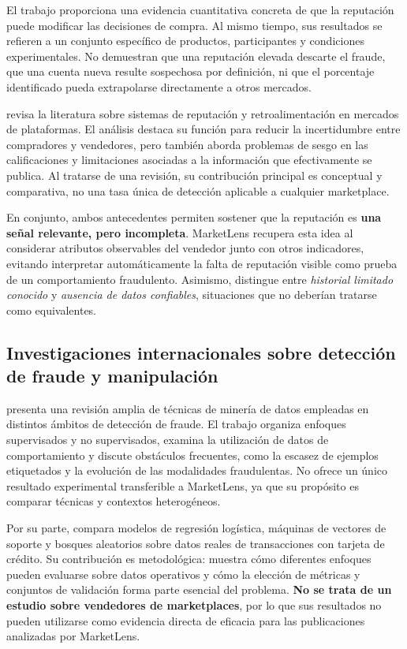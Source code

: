 El trabajo proporciona una evidencia cuantitativa concreta de que la reputación puede modificar las decisiones de compra. Al mismo tiempo, sus resultados se refieren a un conjunto específico de productos, participantes y condiciones experimentales. No demuestran que una reputación elevada descarte el fraude, que una cuenta nueva resulte sospechosa por definición, ni que el porcentaje identificado pueda extrapolarse directamente a otros mercados.

\textcite{ml-tadelis-2016} revisa la literatura sobre sistemas de reputación y retroalimentación en mercados de plataformas. El análisis destaca su función para reducir la incertidumbre entre compradores y vendedores, pero también aborda problemas de sesgo en las calificaciones y limitaciones asociadas a la información que efectivamente se publica. Al tratarse de una revisión, su contribución principal es conceptual y comparativa, no una tasa única de detección aplicable a cualquier marketplace.

En conjunto, ambos antecedentes permiten sostener que la reputación es \textbf{una señal relevante, pero incompleta}. MarketLens recupera esta idea al considerar atributos observables del vendedor junto con otros indicadores, evitando interpretar automáticamente la falta de reputación visible como prueba de un comportamiento fraudulento. Asimismo, distingue entre \emph{historial limitado conocido} y \emph{ausencia de datos confiables}, situaciones que no deberían tratarse como equivalentes.

\subsection{Investigaciones internacionales sobre detección de fraude y manipulación}\label{subsec:ml-fraude-investigaciones}

\textcite{ml-phua-2010} presenta una revisión amplia de técnicas de minería de datos empleadas en distintos ámbitos de detección de fraude. El trabajo organiza enfoques supervisados y no supervisados, examina la utilización de datos de comportamiento y discute obstáculos frecuentes, como la escasez de ejemplos etiquetados y la evolución de las modalidades fraudulentas. No ofrece un único resultado experimental transferible a MarketLens, ya que su propósito es comparar técnicas y contextos heterogéneos.

Por su parte, \textcite{ml-bhattacharyya-2011} compara modelos de regresión logística, máquinas de vectores de soporte y bosques aleatorios sobre datos reales de transacciones con tarjeta de crédito. Su contribución es metodológica: muestra cómo diferentes enfoques pueden evaluarse sobre datos operativos y cómo la elección de métricas y conjuntos de validación forma parte esencial del problema. \textbf{No se trata de un estudio sobre vendedores de marketplaces}, por lo que sus resultados no pueden utilizarse como evidencia directa de eficacia para las publicaciones analizadas por MarketLens.


